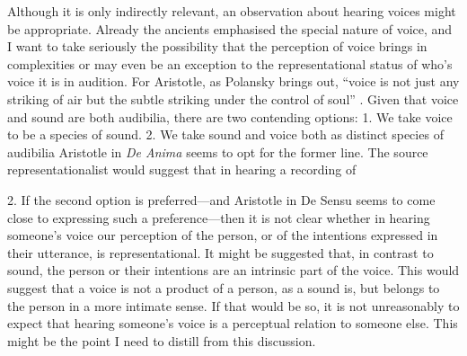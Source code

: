 \documentclass[sloppy, journal, git, bytitle, dodraft]{humapap}
\begin{document}
% 
% 

\sect Although it is only indirectly relevant, an observation about hearing voices might be appropriate. Already the ancients emphasised the special nature of voice, and I want to take seriously the possibility that the perception of voice brings in complexities or may even be an exception to the representational status of who's voice it is in audition. For Aristotle, as Polansky brings out, ``voice is not just any striking of air but the subtle striking under the control of soul'' \autocite[p. 300]{polansky2007aa}. Given that voice and sound are both audibilia, there are two contending options:
1. We take voice to be a species of sound.
2. We take sound and voice both as distinct species of audibilia
Aristotle in \emph{De Anima} seems to opt for the former line. The source representationalist would suggest that in hearing a recording of 

2. If the second option is preferred---and Aristotle in De Sensu seems to come close to expressing such a preference---then it is not clear whether in hearing someone's voice our perception of the person, or of the intentions expressed in their utterance, is representational. It might be suggested that, in contrast to sound, the person or their intentions are an intrinsic part of the voice. This would suggest that a voice is not a product of a person, as a sound is, but belongs to the person in a more intimate sense. If that would be so, it is not unreasonably to expect that hearing someone's voice is a perceptual relation to someone else. This might be the point I need to distill from this discussion. 

\end{document}
